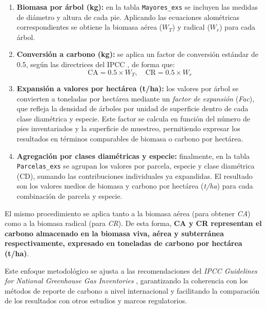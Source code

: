 \begin{enumerate}
    \item \textbf{Biomasa por árbol (kg):} en la tabla \texttt{Mayores\_exs} se incluyen las medidas de diámetro y altura de cada pie. Aplicando las ecuaciones alométricas correspondientes se obtiene la biomasa aérea ($W_T$) y radical ($W_r$) para cada árbol.

    \item \textbf{Conversión a carbono (kg):} se aplica un factor de conversión estándar de 0.5, según las directrices del IPCC \cite{ipcc2006}, de forma que:
    \[
    \text{CA} = 0.5 \times W_T, \quad \text{CR} = 0.5 \times W_r
    \]

    \item \textbf{Expansión a valores por hectárea (t/ha):} los valores por árbol se convierten a toneladas por hectárea mediante un \textit{factor de expansión} (\textit{Fac}), que refleja la densidad de árboles por unidad de superficie dentro de cada clase diamétrica y especie. Este factor se calcula en función del número de pies inventariados y la superficie de muestreo, permitiendo expresar los resultados en términos comparables de biomasa o carbono por hectárea.

    \item \textbf{Agregación por clases diamétricas y especie:} finalmente, en la tabla \texttt{Parcelas\_exs} se agrupan los valores por parcela, especie y clase diamétrica (CD), sumando las contribuciones individuales ya expandidas. El resultado son los valores medios de biomasa y carbono por hectárea (\textit{t/ha}) para cada combinación de parcela y especie.
\end{enumerate}

\medskip

El mismo procedimiento se aplica tanto a la biomasa aérea (para obtener \textit{CA}) como a la biomasa radical (para \textit{CR}). De esta forma, \textbf{CA y CR representan el carbono almacenado en la biomasa viva, aérea y subterránea respectivamente, expresado en toneladas de carbono por hectárea (t/ha)}.

\medskip

Este enfoque metodológico se ajusta a las recomendaciones del \textit{IPCC Guidelines for National Greenhouse Gas Inventories} \cite{ipcc2006}, garantizando la coherencia con los métodos de reporte de carbono a nivel internacional y facilitando la comparación de los resultados con otros estudios y marcos regulatorios.





























